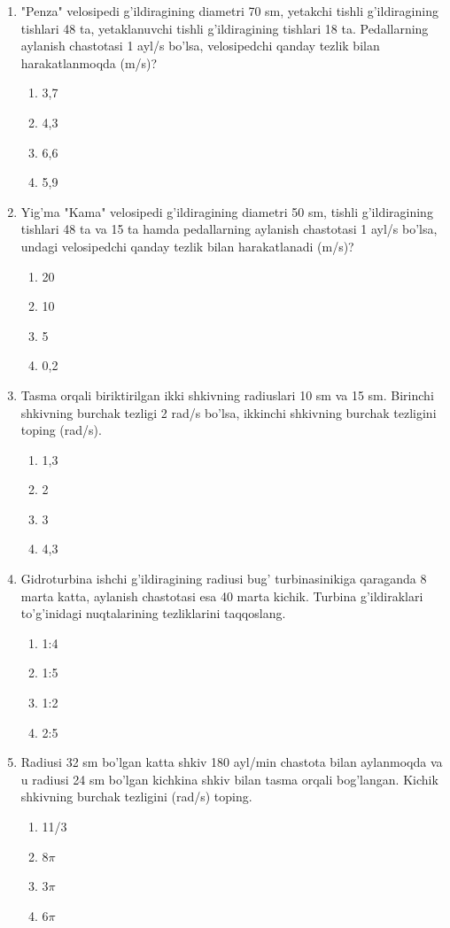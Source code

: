 \begin{enumerate}
\item "Penza" velosipedi g'ildiragining diametri 70 sm, yetakchi tishli g'ildiragining tishlari 48 ta, yetaklanuvchi tishli g'ildiragining tishlari 18 ta. Pedallarning aylanish chastotasi 1 ayl/s bo'lsa, velosipedchi qanday tezlik bilan harakatlanmoqda (m/s)?
\begin{enumerate}[label=\Alph*)]
\item 3,7
\item 4,3
\item 6,6
\item 5,9
\end{enumerate}

\item Yig'ma "Kama" velosipedi g'ildiragining diametri 50 sm, tishli g'ildiragining tishlari 48 ta va 15 ta hamda pedallarning aylanish chastotasi 1 ayl/s bo'lsa, undagi velosipedchi qanday tezlik bilan harakatlanadi (m/s)?
\begin{enumerate}[label=\Alph*)]
\item 20
\item 10
\item 5
\item 0,2
\end{enumerate}

\item Tasma orqali biriktirilgan ikki shkivning radiuslari 10 sm va 15 sm. Birinchi shkivning burchak tezligi 2 rad/s bo'lsa, ikkinchi shkivning burchak tezligini toping (rad/s).
\begin{enumerate}[label=\Alph*)]
\item 1,3
\item 2
\item 3
\item 4,3
\end{enumerate}

\item Gidroturbina ishchi g'ildiragining radiusi bug' turbinasinikiga qaraganda 8 marta katta, aylanish chastotasi esa 40 marta kichik. Turbina g'ildiraklari to'g'inidagi nuqtalarining tezliklarini taqqoslang.
\begin{enumerate}[label=\Alph*)]
\item 1:4
\item 1:5
\item 1:2
\item 2:5
\end{enumerate}

\item Radiusi 32 sm bo'lgan katta shkiv 180 ayl/min chastota bilan aylanmoqda va u radiusi 24 sm bo'lgan kichkina shkiv bilan tasma orqali bog'langan. Kichik shkivning burchak tezligini (rad/s) toping.
\begin{enumerate}[label=\Alph*)]
\item 11/3
\item $8\pi$
\item $3\pi$
\item $6\pi$
\end{enumerate}


\end{enumerate}
